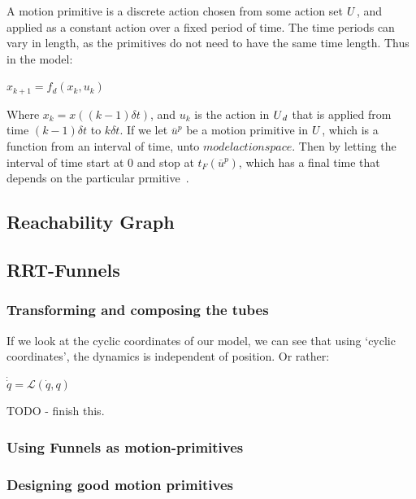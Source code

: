 A motion primitive is a discrete action chosen from some action set
\(U{}\), and applied as a constant action over a fixed period of
time. The time periods can vary in length, as the primitives do not need to have
the same time length. Thus in the model:

\begin{math}
  x_{k+1} = f_d(x_k,u_k)
\end{math} 

Where \(x_k = x((k-1)\delta{}t)\), and \(u_k\) is the action in
\(U{}_d\) that is applied from time \((k-1)\delta{}t\) to
\(k\delta{}t\). If we let \(\overline{u}^p\) be a motion primitive in
\(U{}\), which is a function from an interval of time, unto
\(modelactionspace{}\). Then by letting the interval of time start at 0 and stop
at \(t_F(\overline{u}^p)\), which has a final time that depends on the
particular prmitive~\cite{LaValle09}.


\subsection{Reachability Graph}

\subsection{RRT-Funnels}


\subsubsection{Transforming and composing the tubes}

If we look at the cyclic coordinates of our model, we can see that using `cyclic
coordinates', the dynamics is independent of position. Or rather:

\begin{math}
  \dot{\dot{q}} = \mathcal{L}(\dot{q},q)
\end{math}

TODO - finish this.


\subsubsection{Using Funnels as motion-primitives}

\subsubsection{Designing good motion primitives}